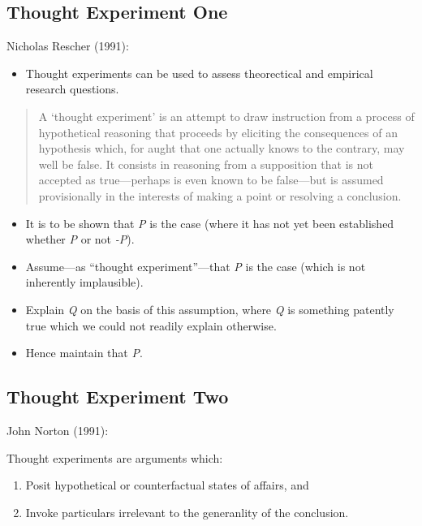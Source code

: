 \documentclass[
  letterpaper,
  DIV=11,
  numbers=noendperiod]{scrreprt}
\providecommand{\tightlist}{%
  \setlength{\itemsep}{0pt}\setlength{\parskip}{0pt}}\usepackage{longtable,booktabs,array}
\begin{document}
\begin{tcolorbox}[enhanced jigsaw, arc=.35mm, breakable, rightrule=.15mm, colback=white, colframe=quarto-callout-important-color-frame, bottomrule=.15mm, leftrule=.75mm, opacityback=0, toprule=.15mm, left=2mm]
\begin{tcolorbox}[enhanced jigsaw, arc=.35mm, breakable, rightrule=.15mm, colback=white, colframe=quarto-callout-tip-color-frame, bottomrule=.15mm, leftrule=.75mm, opacityback=0, toprule=.15mm, left=2mm]
\subsection{Thought Experiment One}\label{thought-experiment-one}

Nicholas Rescher (1991):

\begin{itemize}
\tightlist
\item
  Thought experiments can be used to assess theorectical and empirical
  research questions.
\end{itemize}

\begin{quote}
A `thought experiment' is an attempt to draw instruction from a process
of hypothetical reasoning that proceeds by eliciting the consequences of
an hypothesis which, for aught that one actually knows to the contrary,
may well be false. It consists in reasoning from a supposition that is
not accepted as true---perhaps is even known to be false---but is
assumed provisionally in the interests of making a point or resolving a
conclusion.
\end{quote}

\begin{itemize}
\tightlist
\item
  It is to be shown that \emph{P} is the case (where it has not yet been
  established whether \emph{P} or not \emph{-P}).
\item
  Assume---as ``thought experiment''---that \emph{P} is the case (which
  is not inherently implausible).
\item
  Explain \emph{Q} on the basis of this assumption, where \emph{Q} is
  something patently true which we could not readily explain otherwise.
\item
  Hence maintain that \emph{P}.
\end{itemize}

\subsection{Thought Experiment Two}\label{thought-experiment-two}

John Norton (1991):

Thought experiments are arguments which:

\begin{enumerate}
\def\labelenumi{\arabic{enumi}.}
\tightlist
\item
  Posit hypothetical or counterfactual states of affairs, and
\item
  Invoke particulars irrelevant to the generanlity of the conclusion.
\end{enumerate}


\end{tcolorbox}
\end{tcolorbox}
\end{document}
